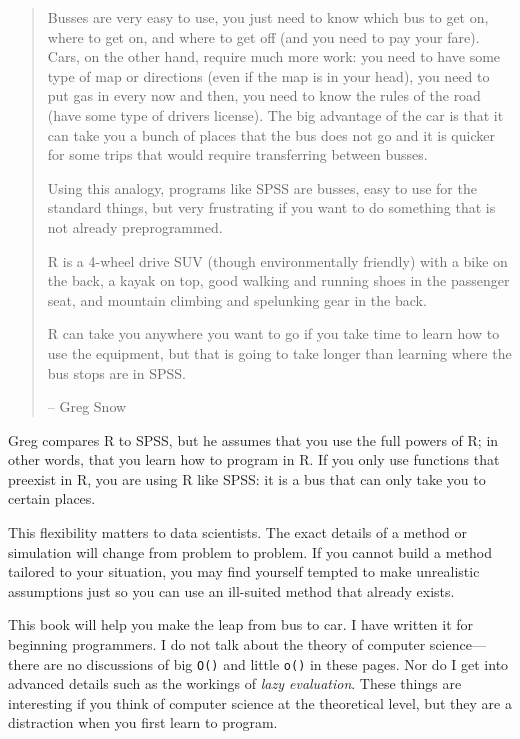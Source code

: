 \documentclass[
  letterpaper,
  DIV=11,
  numbers=noendperiod]{scrbook}
\begin{document}
\begin{quote}
Busses are very easy to use, you just need to know which bus to get on,
where to get on, and where to get off (and you need to pay your fare).
Cars, on the other hand, require much more work: you need to have some
type of map or directions (even if the map is in your head), you need to
put gas in every now and then, you need to know the rules of the road
(have some type of drivers license). The big advantage of the car is
that it can take you a bunch of places that the bus does not go and it
is quicker for some trips that would require transferring between
busses.

Using this analogy, programs like SPSS are busses, easy to use for the
standard things, but very frustrating if you want to do something that
is not already preprogrammed.

R is a 4-wheel drive SUV (though environmentally friendly) with a bike
on the back, a kayak on top, good walking and running shoes in the
passenger seat, and mountain climbing and spelunking gear in the back.

R can take you anywhere you want to go if you take time to learn how to
use the equipment, but that is going to take longer than learning where
the bus stops are in SPSS.

-- Greg Snow
\end{quote}

Greg compares R to SPSS, but he assumes that you use the full powers of
R; in other words, that you learn how to program in R. If you only use
functions that preexist in R, you are using R like SPSS: it is a bus
that can only take you to certain places.

This flexibility matters to data scientists. The exact details of a
method or simulation will change from problem to problem. If you cannot
build a method tailored to your situation, you may find yourself tempted
to make unrealistic assumptions just so you can use an ill-suited method
that already exists.

This book will help you make the leap from bus to car. I have written it
for beginning programmers. I do not talk about the theory of computer
science---there are no discussions of big \texttt{O()} and little
\texttt{o()} in these pages. Nor do I get into advanced details such as
the workings of \emph{lazy evaluation}. These things are interesting if
you think of computer science at the theoretical level, but they are a
distraction when you first learn to program.
\end{document}
